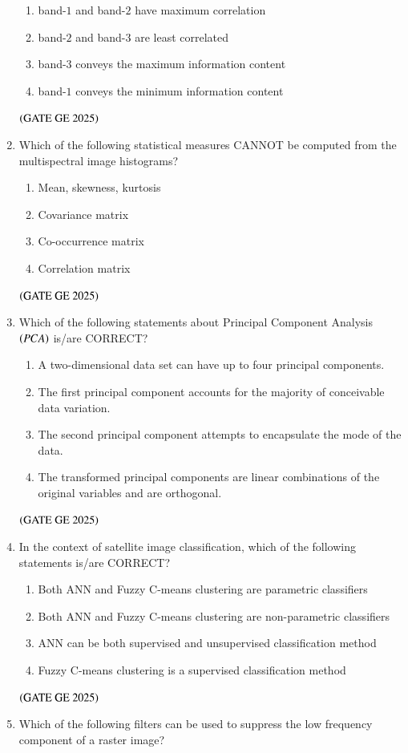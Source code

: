 \documentclass[journal,12pt,onecolumn]{IEEEtran}
\theoremstyle{remark}
\begin{document}
\begin{enumerate}
\begin{enumerate}
\item band-$1$ and band-$2$ have maximum correlation
\item band-$2$ and band-$3$ are least correlated
\item band-$3$ conveys the maximum information content
\item band-$1$ conveys the minimum information content
\end{enumerate}
\hfill $\left(\text{GATE GE 2025}\right)$
\bigskip
\item Which of the following statistical measures CANNOT be computed from the multispectral image histograms?
\begin{enumerate}
\item Mean, skewness, kurtosis
\item Covariance matrix
\item Co-occurrence matrix
\item Correlation matrix
\end{enumerate}
\hfill $\left(\text{GATE GE 2025}\right)$
\bigskip
\item Which of the following statements about Principal Component Analysis $\left(PCA\right)$ is/are CORRECT?
\begin{enumerate}
\item A two-dimensional data set can have up to four principal components.
\item The first principal component accounts for the majority of conceivable data variation.
\item The second principal component attempts to encapsulate the mode of the data.
\item The transformed principal components are linear combinations of the original variables and are orthogonal.
\end{enumerate}
\hfill $\left(\text{GATE GE 2025}\right)$
\bigskip
\item In the context of satellite image classification, which of the following statements is/are CORRECT?
\begin{enumerate}
\item Both ANN and Fuzzy C-means clustering are parametric classifiers
\item Both ANN and Fuzzy C-means clustering are non-parametric classifiers
\item ANN can be both supervised and unsupervised classification method
\item Fuzzy C-means clustering is a supervised classification method
\end{enumerate}
\hfill $\left(\text{GATE GE 2025}\right)$
\bigskip
\item Which of the following filters can be used to suppress the low frequency component of a raster image?
\begin{center}


\end{center}
\end{enumerate}
\end{document}
